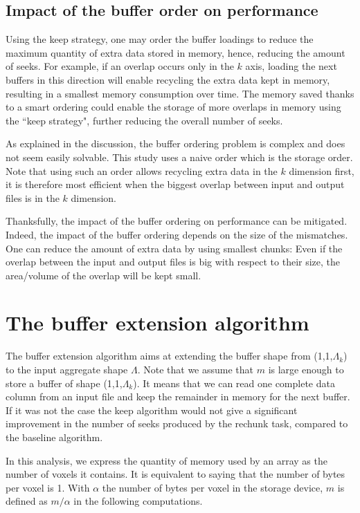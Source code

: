 \documentclass[conference]{IEEEtran}
\begin{document}
\subsection{Impact of the buffer order on performance}
Using the keep strategy, one may order the buffer loadings to reduce the maximum
quantity of extra data stored in memory, hence, reducing the amount of seeks.
For example, if an overlap occurs only in the $k$ axis, loading the next buffers
in this direction will enable recycling the extra data kept in memory, resulting
in a smallest memory consumption over time. The memory saved thanks to a smart
ordering could enable the storage of more overlaps in memory using the
``keep strategy", further reducing the overall number of seeks.

As explained in the discussion, the buffer ordering problem is complex and does
not seem easily solvable.
This study uses a naive order which is the storage order. Note that using such
an order allows recycling extra data in the $k$ dimension first, it is therefore
most efficient when the biggest overlap between input and output files is in the
$k$ dimension.

Thanksfully, the impact of the buffer ordering on performance can be
mitigated. Indeed, the impact of the buffer ordering depends on the size of the
mismatches. One can reduce the amount of extra data by using smallest chunks: Even
if the overlap between the input and output files is big with respect to their
size, the area/volume of the overlap will be kept small.

\section{The buffer extension algorithm}

The buffer extension algorithm aims at extending the buffer shape from
(1,1,$\Lambda_k$) to the input aggregate shape $\Lambda$. Note that we assume
that $m$ is large enough to store a buffer of shape (1,1,$\Lambda_k$). It means
that we can read one complete data column from an input file and keep the
remainder in memory for the next buffer. If it was not the case the keep
algorithm would not give a significant improvement in the number of seeks
produced by the rechunk task, compared to the baseline algorithm.

In this analysis, we express the quantity of memory used by an array as the
number of voxels it contains. It is equivalent to saying that the number of
bytes per voxel is 1. With $\alpha$ the number of bytes per voxel in the storage
device, $m$ is defined as $m/\alpha$ in the following computations.
\end{document}
